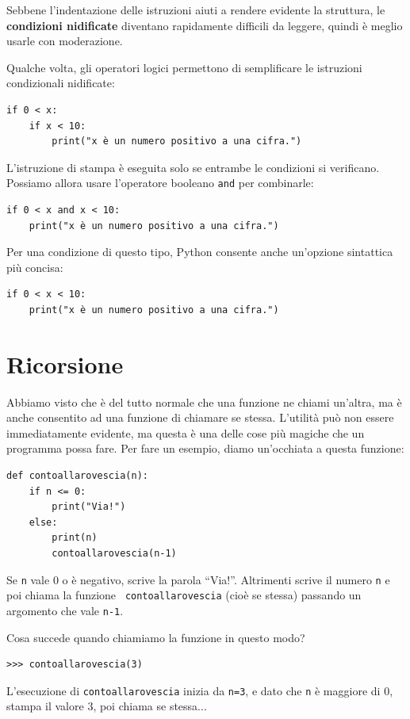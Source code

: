 \documentclass[10pt]{book}
\begin{document}
Sebbene l'indentazione delle istruzioni aiuti a rendere evidente la struttura, le {\bf condizioni nidificate} diventano rapidamente difficili da leggere, quindi è meglio usarle con moderazione.

Qualche volta, gli operatori logici permettono di semplificare le istruzioni condizionali nidificate:

\begin{verbatim}
if 0 < x:
    if x < 10:
        print("x è un numero positivo a una cifra.")
\end{verbatim}
%
L'istruzione di stampa è eseguita solo se entrambe le condizioni si verificano. Possiamo allora usare l'operatore booleano {\tt and} per combinarle:

\begin{verbatim}
if 0 < x and x < 10:
    print("x è un numero positivo a una cifra.")
\end{verbatim}

Per una condizione di questo tipo, Python consente anche un'opzione sintattica più concisa:

\begin{verbatim}
if 0 < x < 10:
    print("x è un numero positivo a una cifra.")
\end{verbatim}


\section{Ricorsione}
\label{recursion}

Abbiamo visto che è del tutto normale che una funzione ne chiami un'altra, ma è anche consentito ad una funzione di chiamare se stessa. L'utilità può non essere immediatamente evidente, ma questa è una delle cose più magiche che un programma possa fare. Per fare un esempio, diamo un'occhiata a questa funzione:

\begin{verbatim}
def contoallarovescia(n):
    if n <= 0:
        print("Via!")
    else:
        print(n)
        contoallarovescia(n-1)
\end{verbatim}
%
Se {\tt n} vale 0 o è negativo, scrive la parola ``Via!''.
Altrimenti scrive il numero {\tt n} e poi chiama la funzione {\tt
contoallarovescia} (cioè se stessa) passando un argomento che vale {\tt n-1}.

Cosa succede quando chiamiamo la funzione in questo modo?

\begin{verbatim}
>>> contoallarovescia(3)
\end{verbatim}
%
L'esecuzione di {\tt contoallarovescia} inizia da {\tt n=3}, e dato che
{\tt n} è maggiore di 0, stampa il valore 3, poi chiama se stessa...
\end{document}
